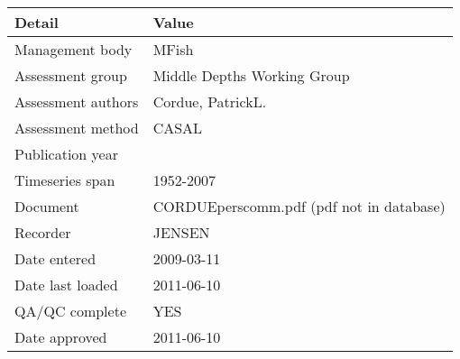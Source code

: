 \begin{table}[htb]
\centering
\begin{tabular}{ll}
\toprule
Detail & Value \\
\midrule
Management body    & MFish                                    \\
Assessment group   & Middle Depths Working Group              \\
Assessment authors & Cordue, PatrickL.                        \\
Assessment method  & CASAL                                    \\
Publication year   &                                          \\
Timeseries span    & 1952-2007                                \\
Document           & CORDUEperscomm.pdf (pdf not in database) \\
Recorder           & JENSEN                                   \\
Date entered       & 2009-03-11                               \\
Date last loaded   & 2011-06-10                               \\
QA/QC complete     & YES                                      \\
Date approved      & 2011-06-10                               \\
\bottomrule
\end{tabular}
\label{tab:assessdet}
\end{table}
